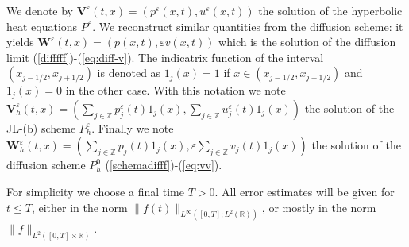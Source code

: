 \documentclass[a4paper,french,english,10pt]{article}
\newcommand\eps{\varepsilon}
\newcommand\V{\mathbf{V}}
\newcommand\W{\mathbf{W}}
\begin{document}
We denote by $\V^{\eps}(t,x)=\left(p^{\eps}(x,t),
u^{\eps}(x,t)\right)$ the solution of the hyperbolic heat equations $P^\eps$. %
We  reconstruct
similar quantities from the diffusion scheme: it yields 
$\W^\eps(t,x)=\left(p(x,t),\varepsilon v(x,t)\right)$ 
which is the 
solution of the diffusion limit
(\ref{difffff})-(\ref{eq:diff-v}).
The indicatrix function of the interval  $(x_{j-1/2},x_{j+1/2})$  is denoted as
 $
 1_j(x)= 1$ if  $x\in (x_{j-1/2},x_{j+1/2})$ and  $1_j(x)=0$ in the other case.
With this notation  we note
$\V^{\eps}_h(t,x)=
\left( \sum_{j\in \mathbb Z} p_j^{\eps}(t) {1}_{j}(x) ,  \sum_{j\in \mathbb Z} u_j^{\eps}(t) {1}_{j}(x) \right)$ the solution of the JL-(b) scheme
 $P_h^\eps$.
Finally we note  $\W_h^\eps(t,x)= \left( \sum_{j\in \mathbb Z} p_j(t) {1}_{j}(x) ,
\varepsilon \sum_{j\in \mathbb Z} v_j(t)  {1}_{j}(x) \right)$ %
the
solution of the diffusion scheme $P_h^0$ (\ref{schemadifff})-(\ref{eq:vv}). 

For simplicity we choose a final time $T>0$.
All  error estimates will be given for 
$t\leq T$, either
in the norm
$\|f(t)\|_{L^\infty([0,T];L^2(\mathbb{R}))}$, or mostly in the norm
$\|f\|_{L^2([0,T]\times \mathbb{R})}$.
\end{document}

